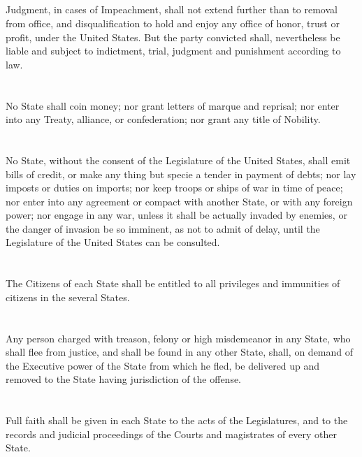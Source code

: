 \documentclass{constitution}
\begin{document}
\section{}
Judgment, in cases of Impeachment,
shall not extend further than to removal from office,
and disqualification to hold and enjoy any office of honor, trust or profit, under the United States.
But the party convicted shall, nevertheless be liable and subject to indictment, trial, judgment and punishment according to law.

\chapter{}
No State shall coin money;
nor grant letters of marque and reprisal;
nor enter into any Treaty, alliance, or confederation;
nor grant any title of Nobility.

\chapter{}
No State, without the consent of the Legislature of the United States,
shall emit bills of credit,
or make any thing but specie a tender in payment of debts;
nor lay imposts or duties on imports;
nor keep troops or ships of war in time of peace;
nor enter into any agreement or compact with another State, or with any foreign power;
nor engage in any war, unless it shall be actually invaded by enemies, or the danger of invasion be so imminent, as not to admit of delay, until the Legislature of the United States can be consulted.

\chapter{}
The Citizens of each State shall be entitled to all privileges and immunities of citizens in the several States.

\chapter{}
Any person charged with treason, felony or high misdemeanor in any State,
who shall flee from justice, and shall be found in any other State,
shall, on demand of the Executive power of the State from which he fled,
be delivered up and removed to the State having jurisdiction of the offense.

\chapter{}
Full faith shall be given in each State to the acts of the Legislatures,
and to the records and judicial proceedings of the Courts and magistrates of every other State.
\end{document}
